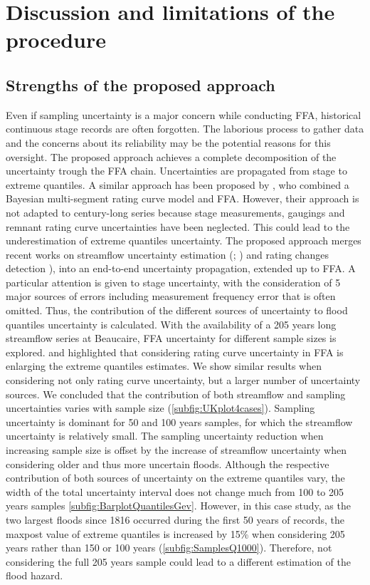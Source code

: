 \documentclass[11pt]{article}
\begin{document}
\section{Discussion and limitations of the procedure}

    \subsection{Strengths of the proposed approach}

    Even if sampling uncertainty is a major concern while conducting FFA, historical continuous stage records are often forgotten. The laborious process to gather data and the concerns about its reliability may be the potential reasons for this oversight. The proposed approach achieves a complete decomposition of the uncertainty trough the FFA chain. Uncertainties are propagated from stage to extreme quantiles. A similar approach has been proposed by \citet{steinbakk_propagation_2016}, who combined a Bayesian multi-segment rating curve model and FFA. However, their approach is not adapted to century-long series because stage measurements, gaugings and remnant rating curve uncertainties have been neglected. This could lead to the underestimation of extreme quantiles uncertainty. The proposed approach merges recent works on streamflow uncertainty estimation (\citet{horner_impact_2018}; \citet{mansanarez_shift_2019}) and rating changes detection \citep{darienzo_detection_2021}), into an end-to-end uncertainty propagation, extended up to FFA. A particular attention is given to stage uncertainty, with the consideration of 5 major sources of errors including measurement frequency error that is often omitted. Thus, the contribution of the different sources of uncertainty to flood quantiles uncertainty is calculated. With the availability of a 205 years long streamflow series at Beaucaire, FFA uncertainty for different sample sizes is explored. \citet{petersen-overleir_accounting_2009} and \citet{steinbakk_propagation_2016} highlighted that considering rating curve uncertainty in FFA is enlarging the extreme quantiles estimates. We show similar results when considering not only rating curve uncertainty, but a larger number of uncertainty sources. We concluded that the contribution of both streamflow and sampling uncertainties varies with sample size (\ref{subfig:UKplot4cases}). Sampling uncertainty is dominant for 50 and 100 years samples, for which the streamflow uncertainty is relatively small. The sampling uncertainty reduction when increasing sample size is offset by the increase of streamflow uncertainty when considering older and thus more uncertain floods. Although the respective contribution of both sources of uncertainty on the extreme quantiles vary, the width of the total uncertainty interval does not change much from 100 to 205 years samples \ref{subfig:BarplotQuantilesGev}. However, in this case study, as the two largest floods since 1816 occurred during the first 50 years of records, the maxpost value of extreme quantiles is increased by 15\% when considering 205 years rather than 150 or 100 years (\ref{subfig:SamplesQ1000}). Therefore, not considering the full 205 years sample could lead to a different estimation of the flood hazard. 
    
\end{document}
